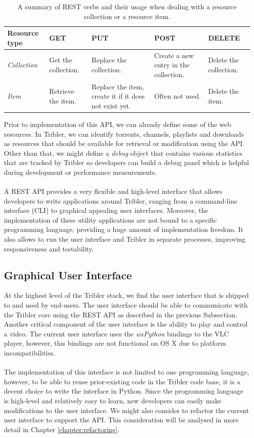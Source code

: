 \begin{table}[h!]
	\centering
	\begin{tabularx}{\textwidth}{|X|X|X|X|X|}
		\hline
		Resource type & \textbf{GET} & \textbf{PUT} & \textbf{POST} & \textbf{DELETE} \\ \hline
		\emph{Collection} & Get the collection. & Replace the collection. & Create a new entry in the collection. & Delete the collection.\\ \hline
		\emph{Item} & Retrieve the item. & Replace the item, create it if it does not exist yet. & Often not used. & Delete the item.\\ \hline
	\end{tabularx}
	\caption{A summary of REST verbs and their usage when dealing with a resource collection or a resource item.}
	\label{table:rest-api-operations}
\end{table}

Prior to implementation of this API, we can already define some of the web resources. In Tribler, we can identify torrents, channels, playlists and downloads as resources that should be available for retrieval or modification using the API. Other than that, we might define a \emph{debug} object that contains various statistics that are tracked by Tribler so developers can build a debug panel which is helpful during development or performance measurements.\\\\
A REST API provides a very flexible and high-level interface that allows developers to write applications around Tribler, ranging from a command-line interface (CLI) to graphical appealing user interfaces. Moreover, the implementation of these utility applications are not bound to a specific programming language, providing a huge amount of implementation freedom. It also allows to run the user interface and Tribler in separate processes, improving responsiveness and testability.

\subsection{Graphical User Interface}
At the highest level of the Tribler stack, we find the user interface that is shipped to and used by end-users. The user interface should be able to communicate with the Tribler core using the REST API as described in the previous Subsection. Another critical component of the user interface is the ability to play and control a video. The current user interface uses the \emph{wxPython} bindings to the VLC player, however, this bindings are not functional on OS X due to platform incompatibilities.\\\\
The implementation of this interface is not limited to one programming language, however, to be able to reuse prior-existing code in the Tribler code base, it is a decent choice to write the interface in Python. Since the programming language is high-level and relatively easy to learn, new developers can easily make modifications to the user interface. We might also consider to refactor the current user interface to support the API. This consideration will be analysed in more detail in Chapter \ref{chapter:refactoring}. 

